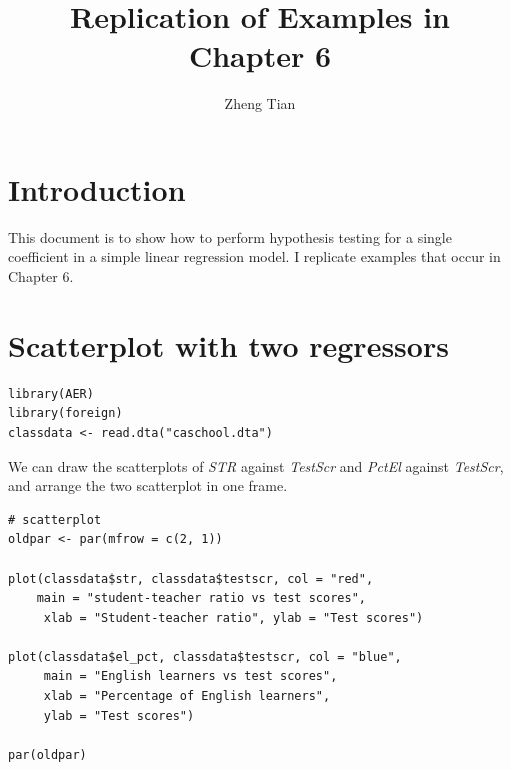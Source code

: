 \documentclass[11pt]{article}
\author{Zheng Tian}
\date{}
\title{Replication of Examples in Chapter 6}
\begin{document}
\maketitle

\section{Introduction}
\label{sec:org453d38a}
This document is to show how to perform hypothesis testing for a
single coefficient in a simple linear regression model. I replicate
examples that occur in Chapter 6.

\section{Scatterplot with two regressors}
\label{sec:orgcc1fe7c}

\begin{verbatim}
library(AER)
library(foreign)
classdata <- read.dta("caschool.dta")
\end{verbatim}

We can draw the scatterplots of \emph{STR} against \emph{TestScr} and \emph{PctEl}
against \emph{TestScr}, and arrange the two scatterplot in one frame.

\begin{verbatim}
# scatterplot
oldpar <- par(mfrow = c(2, 1))

plot(classdata$str, classdata$testscr, col = "red",
    main = "student-teacher ratio vs test scores",
     xlab = "Student-teacher ratio", ylab = "Test scores")

plot(classdata$el_pct, classdata$testscr, col = "blue",
     main = "English learners vs test scores",
     xlab = "Percentage of English learners",
     ylab = "Test scores")

par(oldpar)
\end{verbatim}
\end{document}

